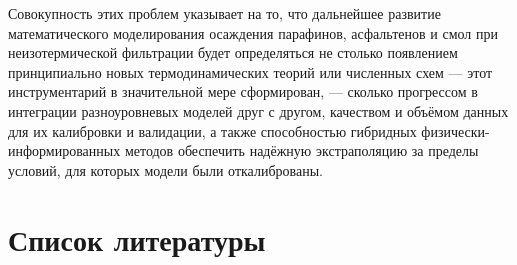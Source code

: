 \documentclass[11pt]{extarticle}
\begin{document}
Совокупность этих проблем указывает на то, что дальнейшее развитие математического моделирования осаждения парафинов, асфальтенов и смол при неизотермической фильтрации будет определяться не столько появлением принципиально новых термодинамических теорий или численных схем --- этот инструментарий в значительной мере сформирован, --- сколько прогрессом в интеграции разноуровневых моделей друг с другом, качеством и объёмом данных для их калибровки и валидации, а также способностью гибридных физически-информированных методов обеспечить надёжную экстраполяцию за пределы условий, для которых модели были откалиброваны.

\newpage

\section{Список литературы}\label{ux441ux43fux438ux441ux43eux43a-ux43bux438ux442ux435ux440ux430ux442ux443ux440ux44b}
\end{document}
